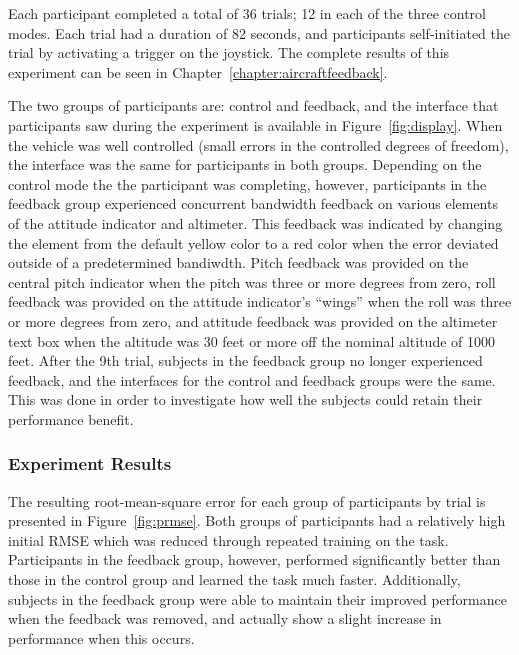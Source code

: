 Each participant completed a total of 36 trials; 12 in each of the three control modes.
Each trial had a duration of 82 seconds, and participants self-initiated the trial by activating a trigger on the joystick.
The complete results of this experiment can be seen in Chapter~\ref{chapter:aircraftfeedback}.

The two groups of participants are: control and feedback, and the interface that participants saw during the experiment is available in Figure~\ref{fig:display}.
When the vehicle was well controlled (small errors in the controlled degrees of freedom), the interface was the same for participants in both groups.
Depending on the control mode the the participant was completing, however, participants in the feedback group experienced concurrent bandwidth feedback on various elements of the attitude indicator and altimeter.
This feedback was indicated by changing the element from the default yellow color to a red color when the error deviated outside of a predetermined bandiwdth.
Pitch feedback was provided on the central pitch indicator when the pitch was three or more degrees from zero, roll feedback was provided on the attitude indicator's ``wings'' when the roll was three or more degrees from zero, and attitude feedback was provided on the altimeter text box when the altitude was 30 feet or more off the nominal altitude of 1000 feet.
After the 9th trial, subjects in the feedback group no longer experienced feedback, and the interfaces for the control and feedback groups were the same.
This was done in order to investigate how well the subjects could retain their performance benefit.

\subsubsection{Experiment Results}
The resulting root-mean-square error for each group of participants by trial is presented in Figure~\ref{fig:prmse}.
Both groups of participants had a relatively high initial RMSE which was reduced through repeated training on the task.
Participants in the feedback group, however, performed significantly better than those in the control group and learned the task much faster.
Additionally, subjects in the feedback group were able to maintain their improved performance when the feedback was removed, and actually show a slight increase in performance when this occurs.

